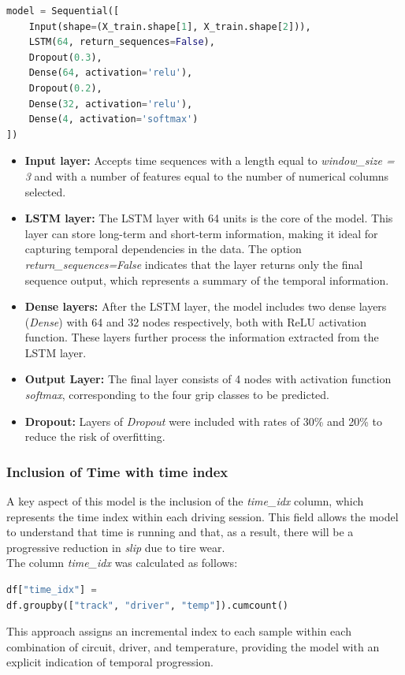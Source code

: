 \documentclass[a4paper,final,12pt]{report}
\begin{document}
\begin{lstlisting}[language=Python, caption=Architecture of the LSTM model]
model = Sequential([
    Input(shape=(X_train.shape[1], X_train.shape[2])),
    LSTM(64, return_sequences=False),
    Dropout(0.3),
    Dense(64, activation='relu'),
    Dropout(0.2),
    Dense(32, activation='relu'),
    Dense(4, activation='softmax')
])
\end{lstlisting}

\begin{itemize}
    \item \textbf{Input layer:} Accepts time sequences with a length equal to \textit{window\_size = 3} and with a number of features equal to the number of numerical columns selected.
    \item \textbf{LSTM layer:} The LSTM layer with 64 units is the core of the model. This layer can store long-term and short-term information, making it ideal for capturing temporal dependencies in the data. The option \textit{return\_sequences=False} indicates that the layer returns only the final sequence output, which represents a summary of the temporal information.
    \item \textbf{Dense layers:} After the LSTM layer, the model includes two dense layers (\textit{Dense}) with 64 and 32 nodes respectively, both with ReLU activation function. These layers further process the information extracted from the LSTM layer.
    \item \textbf{Output Layer:} The final layer consists of 4 nodes with activation function \textit{softmax}, corresponding to the four grip classes to be predicted.
    \item \textbf{Dropout:} Layers of \textit{Dropout} were included with rates of 30\% and 20\% to reduce the risk of overfitting.
\end{itemize}

\subsubsection{Inclusion of Time with time index}
A key aspect of this model is the inclusion of the \textit{time\_idx} column, which represents the time index within each driving session. This field allows the model to understand that time is running and that, as a result, there will be a progressive reduction in \textit{slip} due to tire wear.\\

The column \textit{time\_idx} was calculated as follows:
\begin{lstlisting}[language=Python, caption=Calculation of \textit{time\_idx}]
df["time_idx"] = 
df.groupby(["track", "driver", "temp"]).cumcount()
\end{lstlisting}
This approach assigns an incremental index to each sample within each combination of circuit, driver, and temperature, providing the model with an explicit indication of temporal progression.
\end{document}
